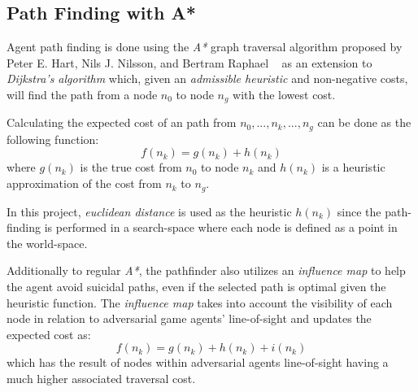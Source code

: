 \documentclass[a4paper, twocolumn]{article}
\begin{document}
        \subsection{Path Finding with A*} \label{sec:path_finding}

	Agent path finding is done using the \emph{A*} graph traversal algorithm proposed by Peter E. Hart, Nils J. Nilsson, and Bertram Raphael ~\cite{hart1968formal} as an extension to \emph{Dijkstra's algorithm} which, given an \emph{admissible heuristic} and non-negative costs, will find the path from a node \(n_0\) to node \(n_g\) with the lowest cost.
	
	Calculating the expected cost of an path from \(n_0,...,n_k,...,n_g\) can be done as the following function:
	\begin{equation*}
		f(n_k) = g(n_k) + h(n_k)
	\end{equation*}	
	where \(g(n_k)\) is the true cost from \(n_0\) to node \(n_k\) and \(h(n_k)\) is a heuristic approximation of the cost from \(n_k\) to \(n_g\).

        In this project, \emph{euclidean distance} is used as the heuristic \(h(n_k)\) since the path-finding is performed in a search-space where each node is defined as a point in the world-space. 

	Additionally to regular \emph{A*}, the pathfinder also utilizes an \emph{influence map} to help the agent avoid suicidal paths, even if the selected path is optimal given the heuristic function. The \emph{influence map} takes into account the visibility of each node in relation to adversarial game agents' line-of-sight and updates the expected cost as:
	\begin{equation*}
		f(n_k) = g(n_k) + h(n_k) + i(n_k)
	\end{equation*} 
	which has the result of nodes within adversarial agents line-of-sight having a much higher associated traversal cost. 
	
\end{document}
